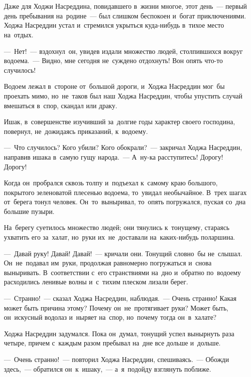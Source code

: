 \documentclass[12pt,a4paper]{book}
\begin{document}
\chapter{}

Даже для Ходжи Насреддина, повидавшего в~жизни многое, этот день~— первый день пребывания на~родине~— был слишком беспокоен и~богат приключениями. Ходжа Насреддин устал и~стремился укрыться куда-нибудь в~тихое место на~отдых.

—~Нет!~— вздохнул~он, увидев издали множество людей, столпившихся вокруг водоема.~— Видно, мне сегодня не~суждено отдохнуть! Вон опять что-то случилось!

Водоем лежал в~стороне от~большой дороги, и~Ходжа Насреддин мог~бы проехать мимо, но~не~таков был наш Ходжа Насреддин, чтобы упустить случай вмешаться в~спор, скандал или драку.

Ишак, в~совершенстве изучивший за~долгие годы характер своего господина, повернул, не~дожидаясь приказаний, к~водоему.

—~Что случилось? Кого убили? Кого обокрали?~— закричал Ходжа Насреддин, направив ишака в~самую гущу народа.~— А~ну-ка расступитесь! Дорогу! Дорогу!

Когда он~пробрался сквозь толпу и~подъехал к~самому краю большого, покрытого зеленоватой плесенью водоема, то~увидал необычайное. В~трех шагах от~берега тонул человек. Он~то~выныривал, то~опять погружался, пуская со~дна большие пузыри.

На~берегу суетилось множество людей; они тянулись к~тонущему, стараясь ухватить его за~халат, но~руки их~не~доставали на~каких-нибудь поларшина.

—~Давай руку! Давай! Давай!~— кричали они. Тонущий словно~бы не~слышал. Он~не~подавал им~руки, продолжая равномерно погружаться и~снова выныривать. В~соответствии с~его странствиями на~дно и~обратно по~водоему расходились ленивые волны и~с~тихим плеском лизали берег.

—~Странно!~— сказал Ходжа Насреддин, наблюдая.~— Очень странно! Какая может быть причина этому? Почему он~не~протягивает руки? Может быть, он~искусный водолаз и~ныряет на~спор, но~почему тогда он~в~халате?

Ходжа Насреддин задумался. Пока он~думал, тонущий успел вынырнуть раза четыре, причем с~каждым разом пребывал на~дне все дольше и~дольше.

—~Очень странно!~— повторил Ходжа Насреддин, спешиваясь.~— Обожди здесь,~— обратился он~к~ишаку,~— а~я~подойду взглянуть поближе.
\end{document}
